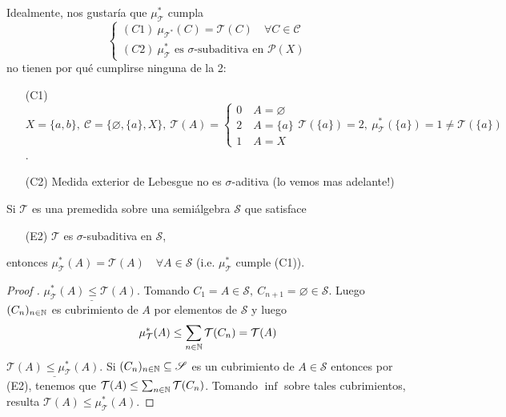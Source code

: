Idealmente, nos gustaría que $\mu_{\mathcal{T}}^{*}$ cumpla
\[ \begin{cases}
	(C1) \ \mu_{\mathcal{T}^{*}}(C) = \mathcal{T}(C) \quad \forall C \in \mathscr{C} \\
	(C2) \ \mu_{\mathcal{T}}^{*} \text{ es } \sigma\text{-subaditiva en } \mathscr{P}(X)
\end{cases} \]
no tienen por qué cumplirse ninguna de la 2:
\begin{enumerate}
	\item[(C1)] $X = \{a,b\},\ \mathscr{C} = \{\varnothing, \{a\}, X\},\ \mathcal{T}(A) = \begin{cases}
		0 \quad A = \varnothing \\
		2 \quad A = \{a\} \\
		1 \quad A = X
	\end{cases} \mathcal{T}(\{a\}) = 2,\ \mu_{\mathcal{T}}^{*}(\{a\}) = 1 \neq \mathcal{T}(\{a\})$.

	\item[(C2)] Medida exterior de Lebesgue no es $\sigma$-aditiva (lo vemos mas adelante!)
\end{enumerate}

\begin{prop}
	Si $\mathcal{T}$ es una premedida sobre una semiálgebra $\mathscr{S}$ que satisface
	\begin{enumerate}
		\item[(E2)] $\mathcal{T}$ es $\sigma$-subaditiva en $\mathscr{S}$,
	\end{enumerate}
	entonces $\mu_{\mathcal{T}}^{*}(A) = \mathcal{T}(A)\quad \forall A \in \mathscr{S}$ (i.e. $\mu_{\mathcal{T}}^{*}$ cumple (C1)).
\end{prop}
\begin{proof}[Proof ]
	$\underline{\mu_{\mathcal{T}}^{*}(A) \leq \mathcal{T}(A).}$ Tomando $C_1 = A \in \mathscr{S},\ C_{n+1} = \varnothing \in \mathscr{S}$. Luego $(C_n)_{n\in\mathbb{N}}$ es cubrimiento de $A$ por elementos de $\mathscr{S}$ y luego
	\[ \mu_{\mathcal{T}}^{*}(A) \leq \sum_{n\in\mathbb{N}} \mathcal{T}(C_n) = \mathcal{T}(A) \]
	$\underline{\mathcal{T}(A) \leq \mu_{\mathcal{T}}^{*}(A).}$ Si $(C_n)_{n\in\mathbb{N}}\subseteq \mathscr{S}$ es un cubrimiento de $A \in \mathscr{S}$ entonces por (E2), tenemos que $\mathcal{T}(A) \leq \sum_{n\in\mathbb{N}} \mathcal{T}(C_n)$. Tomando $\inf$ sobre tales cubrimientos, resulta $\mathcal{T}(A) \leq \mu_{\mathcal{T}}^{*}(A)$.
\end{proof}

